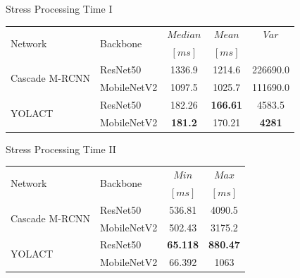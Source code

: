 \documentclass[18pt]{beamer}
\begin{document}
\begin{frame}{Stress Processing Time I}
\begin{table}[h]
    \begin{tabular}{ll | ccc}
        \toprule
        \multirow{2}{*}{Network}        & \multicolumn{1}{l}{\multirow{2}{*}{Backbone}}  & $Median$  & $Mean$    & $Var$     \\
        \multirow{1}{*}{}               & \multicolumn{1}{l}{\multirow{1}{*}{}}  			& $[ms]$  	& $[ms]$    & 		    \\
        \midrule
        \multirow{2}{*}{Cascade M-RCNN} & ResNet50                      & 1336.9    & 1214.6    & 226690.0 \\
        \multirow{1}{*}{}               & MobileNetV2                   & 1097.5    & 1025.7    & 111690.0  \\
        \midrule
        \multirow{2}{*}{YOLACT}         & ResNet50                      & 182.26    & \textbf{166.61}    & 4583.5   \\
        \multirow{1}{*}{}               & MobileNetV2                   & \textbf{181.2}     & 170.21    & \textbf{4281}\\
        \bottomrule
    \end{tabular}
\end{table}
\end{frame}

\begin{frame}{Stress Processing Time II}
\begin{table}[h]
    \begin{tabular}{ll | cc}
        \toprule
        \multirow{2}{*}{Network}        & \multicolumn{1}{l}{\multirow{2}{*}{Backbone}} & $Min$     & $Max$     \\
        \multirow{1}{*}{}               & \multicolumn{1}{l}{\multirow{1}{*}{}}  			& $[ms]$    & $[ms]$     \\
        \midrule
        \multirow{2}{*}{Cascade M-RCNN} & ResNet50                      & 536.81    & 4090.5    \\
        \multirow{1}{*}{}               & MobileNetV2                   & 502.43    & 3175.2    \\
        \midrule
        \multirow{2}{*}{YOLACT}         & ResNet50                       & \textbf{65.118}    & \textbf{880.47}    \\
        \multirow{1}{*}{}               & MobileNetV2                    & 66.392    & 1063      \\
        \bottomrule
    \end{tabular}
\end{table}
\end{frame}
\end{document}
